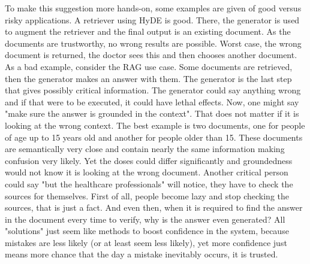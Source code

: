 To make this suggestion more hands-on, some examples are given of good versus risky applications. A retriever using HyDE is good. There, the generator is used to augment the retriever and the final output is an existing document. As the documents are trustworthy, no wrong results are possible. Worst case, the wrong document is returned, the doctor sees this and then chooses another document. As a bad example, consider the RAG use case. Some documents are retrieved, then the generator makes an answer with them. The generator is the last step that gives possibly critical information. The generator could say anything wrong and if that were to be executed, it could have lethal effects. Now, one might say "make sure the answer is grounded in the context". That does not matter if it is looking at the wrong context. The best example is two documents, one for people of age up to 15 years old and another for people older than 15. These documents are semantically very close and contain nearly the same information making confusion very likely. Yet the doses could differ significantly and groundedness would not know it is looking at the wrong document. Another critical person could say "but the healthcare professionals" will notice, they have to check the sources for themselves. First of all, people become lazy and stop checking the sources, that is just a fact. And even then, when it is required to find the answer in the document every time to verify, why is the answer even generated? All "solutions" just seem like methods to boost confidence in the system, because mistakes are less likely (or at least seem less likely), yet more confidence just means more chance that the day a mistake inevitably occurs, it is trusted.

